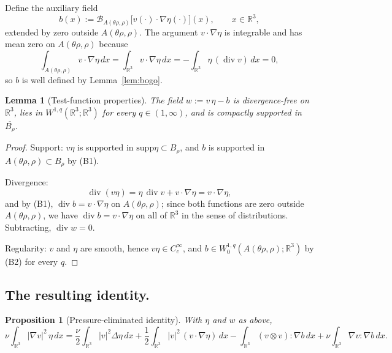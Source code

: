 \documentclass[11pt]{amsart}
\newtheorem{lemma}[theorem]{Lemma}
\newtheorem{proposition}[theorem]{Proposition}
\theoremstyle{definition}
\newcommand{\RR}{\mathbb{R}}
\newcommand{\BB}{\mathcal{B}}    %
\newcommand{\abs}[1]{|#1|}
\newcommand{\supp}{\mathrm{supp}}
\DeclareMathOperator{\dv}{div}
\begin{document}
Define the auxiliary field
\begin{equation}\label{eq:bogo-aux}
b(x) := \BB_{A(\theta\rho, \rho)}\!\bigl[v(\cdot) \cdot \nabla\eta(\cdot)\bigr](x),
\qquad x \in \RR^3,
\end{equation}
extended by zero outside $A(\theta\rho, \rho)$. The argument
$v \cdot \nabla \eta$ is integrable and has mean zero on
$A(\theta\rho, \rho)$ because
\[
\int_{A(\theta\rho,\rho)} v \cdot \nabla \eta\, dx =
\int_{\RR^3} v \cdot \nabla \eta\, dx =
-\int_{\RR^3} \eta\, (\dv v)\, dx = 0,
\]
so $b$ is well defined by Lemma~\ref{lem:bogo}.

\begin{lemma}[Test-function properties]\label{lem:w-props}
The field $w := v\,\eta - b$ is divergence-free on $\RR^3$,
lies in $W^{1,q}(\RR^3; \RR^3)$ for every $q \in (1, \infty)$,
and is compactly supported in $\overline{B_\rho}$.
\end{lemma}

\begin{proof}
Support: $v\eta$ is supported in $\supp \eta \subset B_\rho$, and
$b$ is supported in $A(\theta\rho, \rho) \subset B_\rho$ by (B1).

Divergence:
\[
\dv(v\eta) = \eta\,\dv v + v \cdot \nabla \eta = v \cdot \nabla \eta,
\]
and by (B1), $\dv b = v \cdot \nabla \eta$ on
$A(\theta\rho, \rho)$; since both functions are zero outside
$A(\theta\rho, \rho)$, we have $\dv b = v \cdot \nabla \eta$ on
all of $\RR^3$ in the sense of distributions. Subtracting,
$\dv w = 0$.

Regularity: $v$ and $\eta$ are smooth, hence $v\eta \in C^\infty_c$,
and $b \in W^{1,q}_0(A(\theta\rho, \rho); \RR^3)$ by (B2) for
every $q$.
\end{proof}

\subsection{The resulting identity.}

\begin{proposition}[Pressure-eliminated identity]\label{prop:elim}
With $\eta$ and $w$ as above,
\begin{equation}\label{eq:master-identity}
\nu\int_{\RR^3} \abs{\nabla v}^2\,\eta\, dx
= \frac{\nu}{2}\int_{\RR^3} \abs{v}^2 \Delta\eta\, dx
+ \frac{1}{2}\int_{\RR^3} \abs{v}^2\,(v \cdot \nabla \eta)\, dx
- \int_{\RR^3} (v \otimes v) \colon \nabla b\, dx
+ \nu\int_{\RR^3} \nabla v \colon \nabla b\, dx.
\end{equation}
\end{proposition}
\end{document}
